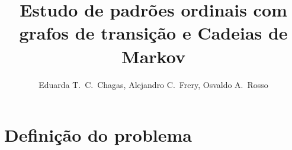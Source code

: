 \documentclass[10pt]{article}
\title{Estudo de padrões ordinais com grafos de transição e Cadeias de Markov}
\author{
	Eduarda T.\ C.\ Chagas\inst{1}, 
	Alejandro C.\ Frery,
	Osvaldo A.\ Rosso
}
\begin{document}
\maketitle

\section*{\centering Definição do problema} \label{abstract}



\end{document}
